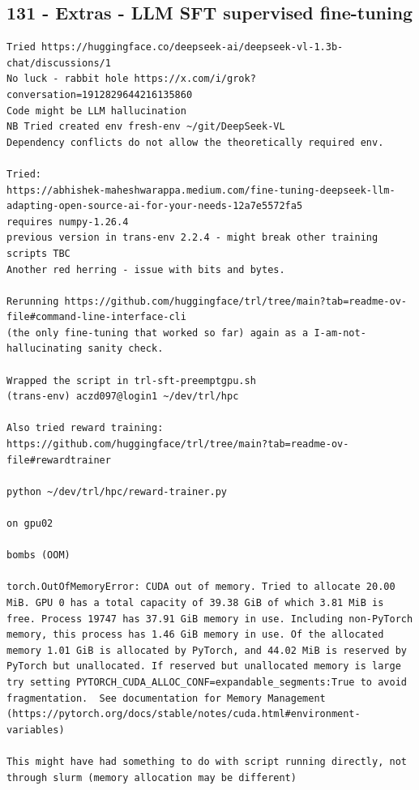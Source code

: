\subsection{131 - Extras - LLM SFT supervised fine-tuning}
\label{app_res:131}

\begin{verbatim}
Tried https://huggingface.co/deepseek-ai/deepseek-vl-1.3b-chat/discussions/1
No luck - rabbit hole https://x.com/i/grok?conversation=1912829644216135860
Code might be LLM hallucination
NB Tried created env fresh-env ~/git/DeepSeek-VL
Dependency conflicts do not allow the theoretically required env.

Tried:
https://abhishek-maheshwarappa.medium.com/fine-tuning-deepseek-llm-adapting-open-source-ai-for-your-needs-12a7e5572fa5
requires numpy-1.26.4
previous version in trans-env 2.2.4 - might break other training scripts TBC
Another red herring - issue with bits and bytes.

Rerunning https://github.com/huggingface/trl/tree/main?tab=readme-ov-file#command-line-interface-cli
(the only fine-tuning that worked so far) again as a I-am-not-hallucinating sanity check.

Wrapped the script in trl-sft-preemptgpu.sh
(trans-env) aczd097@login1 ~/dev/trl/hpc

Also tried reward training:
https://github.com/huggingface/trl/tree/main?tab=readme-ov-file#rewardtrainer

python ~/dev/trl/hpc/reward-trainer.py

on gpu02

bombs (OOM)

torch.OutOfMemoryError: CUDA out of memory. Tried to allocate 20.00 MiB. GPU 0 has a total capacity of 39.38 GiB of which 3.81 MiB is free. Process 19747 has 37.91 GiB memory in use. Including non-PyTorch memory, this process has 1.46 GiB memory in use. Of the allocated memory 1.01 GiB is allocated by PyTorch, and 44.02 MiB is reserved by PyTorch but unallocated. If reserved but unallocated memory is large try setting PYTORCH_CUDA_ALLOC_CONF=expandable_segments:True to avoid fragmentation.  See documentation for Memory Management  (https://pytorch.org/docs/stable/notes/cuda.html#environment-variables)

This might have had something to do with script running directly, not through slurm (memory allocation may be different)


\end{verbatim}
